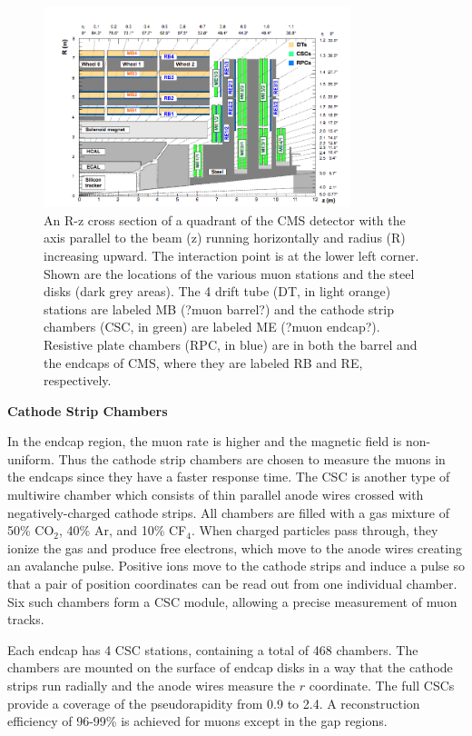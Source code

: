 \documentclass[thesis.tex]{subfiles}
\begin{document}
\begin{figure}[hbt]
	\centering
	\includegraphics[width=0.8\textwidth]{plot/DT.png}
	\caption{An R-z cross section of a quadrant of the CMS detector with the axis parallel to the beam (z) running horizontally and radius (R) increasing upward.  The interaction point is at the lower left corner. 
	 Shown are the locations of the various muon stations and the steel disks (dark grey areas). The 4 drift tube (DT, in light orange) stations are labeled MB (?muon barrel?) and the cathode strip chambers (CSC, in green) are labeled ME (?muon endcap?).              Resistive plate chambers (RPC, in blue) are in both the barrel and the endcaps of CMS, where they are labeled RB and RE, respectively.}
	\label{fig:DT}
\end{figure}

\noindent \textbf{Cathode Strip Chambers}

In the endcap region, the muon rate is higher and the magnetic field is non-uniform.
Thus the cathode strip chambers are chosen to measure the muons in the endcaps since they have a faster response time. 
The CSC is another type of multiwire chamber which consists of thin parallel anode wires crossed with negatively-charged cathode strips.
All chambers are filled with a gas mixture of 50\% CO$_2$, 40\% Ar, and 10\% CF$_4$.
When charged particles pass through, they ionize the gas and produce free electrons, which move to the anode wires creating an avalanche pulse.
Positive ions move to the cathode strips and induce a pulse so that a pair of position coordinates can be read out from one individual chamber.
Six such chambers form a CSC module, allowing a precise measurement of muon tracks. 

Each endcap has 4 CSC stations, containing a total of 468 chambers.
The chambers are mounted on the surface of endcap disks in a way that the cathode strips run radially and the anode wires measure the $r$ coordinate. 
The full CSCs provide a coverage of the pseudorapidity from 0.9 to 2.4.
A reconstruction efficiency of 96-99\% is achieved for muons except in the gap regions.
\end{document}

